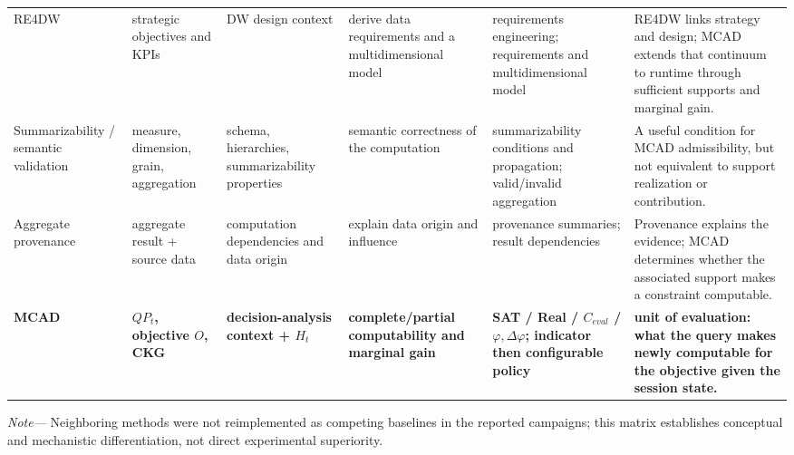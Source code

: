 \begin{table}[!t]
\begin{tabularx}{\textwidth}{@{}p{2.05cm}p{2.15cm}p{2.05cm}p{2.25cm}p{3.45cm}X@{}}
RE4DW~\cite{NasiriAhmedWrembelZimanyi2017} & strategic objectives and KPIs & DW design context & derive data requirements and a multidimensional model & requirements engineering; requirements and multidimensional model & RE4DW links strategy and design; MCAD extends that continuum to runtime through sufficient supports and marginal gain. \\
Summarizability / semantic validation~\cite{SimonAmannLiuGancarski2023} & measure, dimension, grain, aggregation & schema, hierarchies, summarizability properties & semantic correctness of the computation & summarizability conditions and propagation; valid/invalid aggregation & A useful condition for MCAD admissibility, but not equivalent to support realization or contribution. \\
Aggregate provenance~\cite{AlOmeirLaiMilaniPottinger2023} & aggregate result + source data & computation dependencies and data origin & explain data origin and influence & provenance summaries; result dependencies & Provenance explains the evidence; MCAD determines whether the associated support makes a constraint computable. \\
\textbf{MCAD} & \textbf{$QP_t$, objective $O$, CKG} & \textbf{decision-analysis context + $H_t$} & \textbf{complete/partial computability and marginal gain} & \textbf{SAT / Real / $C_{eval}$ / $\varphi,\Delta\varphi$; indicator then configurable policy} & \textbf{unit of evaluation: what the query makes newly computable for the objective given the session state.} \\
\bottomrule
\end{tabularx}
\vspace{0.7mm}
\begin{minipage}{0.985\textwidth}
\footnotesize\emph{Note---} Neighboring methods were not reimplemented as competing baselines in the reported campaigns; this matrix establishes conceptual and mechanistic differentiation, not direct experimental superiority.
\end{minipage}
\normalsize
\end{table}
